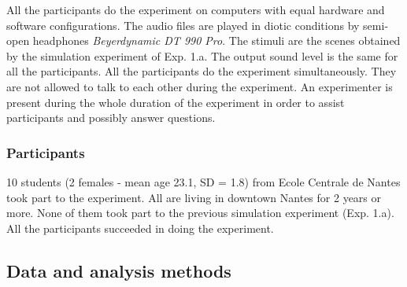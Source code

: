 \documentclass[preprint,12pt]{elsarticle}
\begin{document}
All the participants do the experiment on computers with equal hardware and software configurations. The audio files are played in diotic conditions by semi-open headphones \emph{Beyerdynamic DT 990 Pro}. The stimuli are the scenes obtained by the simulation experiment of Exp. 1.a. The output sound level is the same for all the participants.
All the participants do the experiment simultaneously. They are not allowed to talk to each other during the experiment.
An experimenter is present during the whole duration of the experiment in order to assist participants and possibly answer questions.


\subsubsection*{Participants}

%

10 students (2 females - mean age 23.1, SD = 1.8) from Ecole Centrale de Nantes took part to the experiment. All are living in downtown Nantes for 2 years or more. None of them took part to the previous simulation experiment (Exp. 1.a).
All the participants succeeded in doing the experiment.

\subsection{Data and analysis methods}
\label{sec:xp1_dataAna}
\end{document}
